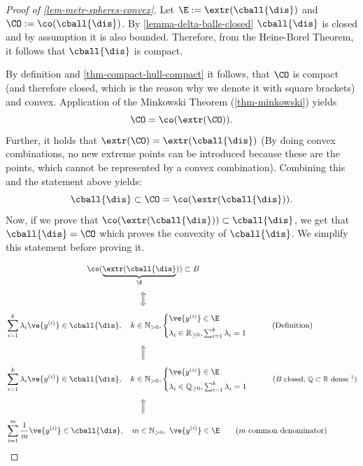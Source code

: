 \begin{proof}[Proof of \cref{lem-metr-spheres-convex}] \label{proof-metr-spheres-convex}
	Let $\E := \extr ( \cball{\dis})$ and $\CO := \co(\cball{\dis})$.
	By \cref{lemma-delta-balls-closed} $\cball{\dis}$ is closed and by assumption it is also bounded. Therefore, from the Heine-Borel Theorem, it follows that $\cball{\dis}$ is compact.

	By definition and \cref{thm-compact-hull-compact} it follows, that $\CO$ is compact (and therefore closed, which is the reason why we denote it with square brackets) and convex. Application of the Minkowski Theorem (\cref{thm-minkowski}) yields
	$$ \CO = \co(\extr ( \CO )). $$
	Further, it holds that $\extr(\CO) = \extr(\cball{\dis})$ (By doing convex combinations, no new extreme points can be introduced because these are the points, which cannot be represented by a convex combination).
  Combining this and the statement above yields:
	$$ \cball{\dis} \subset \CO = \co ( \extr (\cball{\dis})). $$
	Now, if we prove that $\co ( \extr (\cball{\dis})) \subset \cball{\dis}$, we get that $\cball{\dis} = \CO$ which proves the convexity of $\cball{\dis}$.
	We simplify this statement before proving it.

  \newcommand\yy[1][i]{\ve{y^{(#1)}}}

	\begin{align*}
		 & \centerline{$\co( \underbrace{\extr (\cball{\dis}}_{\E})) \subset B$}                                                    \\[1ex]
		 & \centerline{$\Big \Updownarrow$}                                                                                           \\[1ex]
		 & \sum_{i=1}^{k} \lambda_i \yy \in \cball{\dis}, \quad k \in \mathbb{N}_{> 0},
		\begin{cases}
			\yy \in \E \\[1ex]
			\lambda_i \in \mathbb{R}_{\geq 0}, \sum_{i=1}^{k} \lambda_i = 1
		\end{cases} \tag{Definition}                                                               \\[1ex]
		 & \centerline{$\Big \Uparrow$}                                                                                               \\[1ex]
		 & \sum_{i=1}^{k} \lambda_i \yy \in \cball{\dis}, \quad k \in \mathbb{N}_{> 0},
		\begin{cases}
			\yy \in \E \\[1ex]
			\lambda_i \in \mathbb{Q}_{\geq 0}, \sum_{i=1}^{k} \lambda_i = 1
    \end{cases} \tag{\small{$B$ closed, $\mathbb{Q} \subset \mathbb{R}$ dense \footnotemark}}                                              \\[1ex]
		 & \centerline{$\Big \Uparrow$}                                                                                               \\[1ex]
		 & \sum_{i=1}^{m} \frac{1}{m} \yy \in \cball{\dis}, \quad m \in \mathbb{N}_{> 0}, ~ \yy \in \E \tag{$m$ common denominator}
	\end{align*}


\end{proof}
